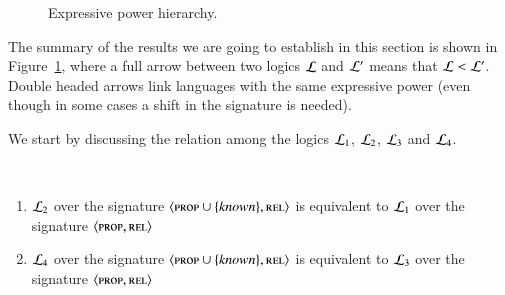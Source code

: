 \begin{figure}
\begin{center}
\end{center}
\caption{Expressive power hierarchy.}\label{fig-expressivity}
\end{figure}


The summary of the results we are going to establish in this section
is shown in Figure~\ref{fig-expressivity}, where a full arrow
between two logics $\mathcal{L}$ and $\mathcal{L}'$ means that $\mathcal{L} < \mathcal{L}'$. Double
headed arrows link languages with the same expressive power (even though
in some cases a shift in the signature is needed).



We start by discussing the relation among the logics  $\mathcal{L}_1$, $\mathcal{L}_2$,
$\mathcal{L}_3$ and $\mathcal{L}_4$.

\begin{thm} \
\begin{enumerate}
\item $\mathcal{L}_2$ over the signature $\langle \textsc{prop} \cup \{\mathit{known}\}, \textsc{rel} \rangle$ is equivalent to $\mathcal{L}_1$ over the signature $\langle \textsc{prop}, \textsc{rel} \rangle$
\item $\mathcal{L}_4$ over the signature $\langle \textsc{prop} \cup \{\mathit{known}\}, \textsc{rel} \rangle$ is equivalent to $\mathcal{L}_3$ over the signature $\langle \textsc{prop}, \textsc{rel} \rangle$
\end{enumerate}
\end{thm}

